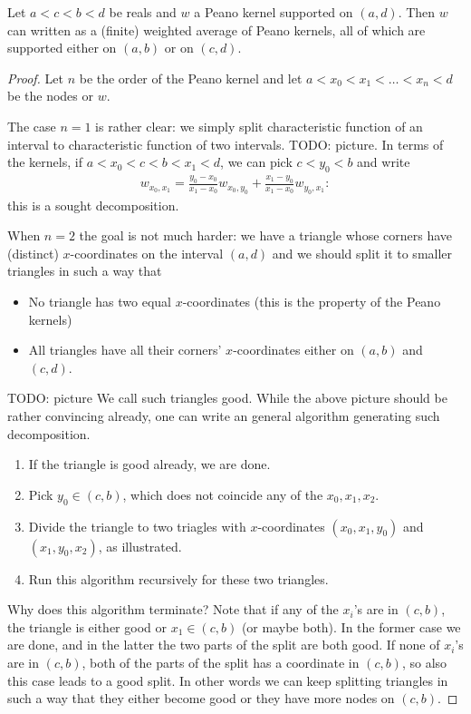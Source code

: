 \begin{lem}\label{peano_splitting_theorem}
	Let $a < c < b < d$ be reals and $w$ a Peano kernel supported on $(a, d)$. Then $w$ can written as a (finite) weighted average of Peano kernels, all of which are supported either on $(a, b)$ or on $(c, d)$.
\end{lem}
\begin{proof}
	Let $n$ be the order of the Peano kernel and let $a < x_{0} < x_{1} < \ldots < x_{n} < d$ be the nodes or $w$.

	The case $n = 1$ is rather clear: we simply split characteristic function of an interval to characteristic function of two intervals. TODO: picture. In terms of the kernels, if $a < x_{0} < c < b < x_{1} < d$, we can pick $c < y_{0} < b$ and write
	\begin{align*}
		w_{x_{0}, x_{1}} = \frac{y_{0} - x_{0}}{x_{1} - x_{0}} w_{x_{0}, y_{0}} + \frac{x_{1} - y_{0}}{x_{1} - x_{0}} w_{y_{0}, x_{1}}:
	\end{align*}
	this is a sought decomposition.

	When $n = 2$ the goal is not much harder: we have a triangle whose corners have (distinct) $x$-coordinates on the interval $(a, d)$ and we should split it to smaller triangles in such a way that
	\begin{itemize}
		\item No triangle has two equal $x$-coordinates (this is the property of the Peano kernels)
		\item All triangles have all their corners' $x$-coordinates either on $(a, b)$ and $(c, d)$.
	\end{itemize}
	TODO: picture
	We call such triangles good. While the above picture should be rather convincing already, one can write an general algorithm generating such decomposition.
	\begin{enumerate}
		\item If the triangle is good already, we are done.
		\item Pick $y_{0} \in (c, b)$, which does not coincide any of the $x_{0}, x_{1}, x_{2}$.
		\item Divide the triangle to two triagles with $x$-coordinates $(x_{0}, x_{1}, y_{0})$ and $(x_{1}, y_{0}, x_{2})$, as illustrated.
		\item Run this algorithm recursively for these two triangles.
	\end{enumerate}
	Why does this algorithm terminate? Note that if any of the $x_{i}$'s are in $(c, b)$, the triangle is either good or $x_{1} \in (c, b)$ (or maybe both). In the former case we are done, and in the latter the two parts of the split are both good. If none of $x_{i}$'s are in $(c, b)$, both of the parts of the split has a coordinate in $(c, b)$, so also this case leads to a good split. In other words we can keep splitting triangles in such a way that they either become good or they have more nodes on $(c, b)$.


\end{proof}
